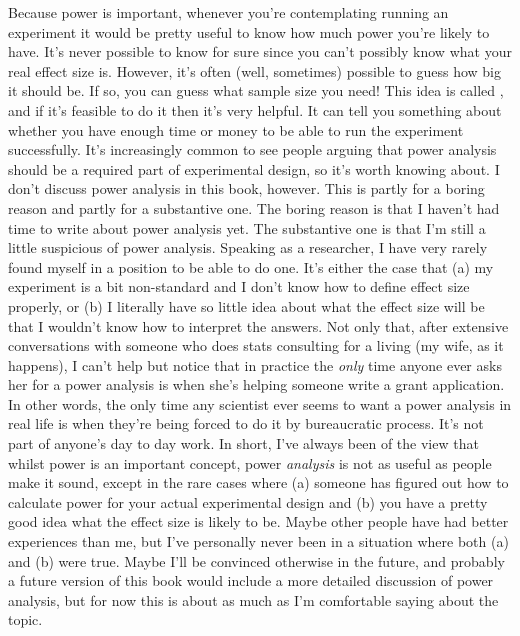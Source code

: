 Because power is important, whenever you're contemplating running an experiment it would be pretty useful to know how much power you're likely to have. It's never possible to know for sure since you can't possibly know what your real effect size is. However, it's often (well, sometimes) possible to guess how big it should be. If so, you can guess what sample size you need! This idea is called , and if it's feasible to do it then it's very helpful. It can tell you something about whether you have enough time or money to be able to run the experiment successfully. It's increasingly common to see people arguing that power analysis should be a required part of experimental design, so it's worth knowing about. I don't discuss power analysis in this book, however. This is partly for a boring reason and partly for a substantive one. The boring reason is that I haven't had time to write about power analysis yet. The substantive one is that I'm still a little suspicious of power analysis. Speaking as a researcher, I have very rarely found myself in a position to be able to do one. It's either the case that (a) my experiment is a bit non-standard and I don't know how to define effect size properly, or (b) I literally have so little idea about what the effect size will be that I wouldn't know how to interpret the answers. Not only that, after extensive conversations with someone who does stats consulting for a living (my wife, as it happens), I can't help but notice that in practice the {\it only} time anyone ever asks her for a power analysis is when she's helping someone write a grant application. In other words, the only time any scientist ever seems to want a power analysis in real life is when they're being forced to do it by bureaucratic process. It's not part of anyone's day to day work. In short, I've always been of the view that whilst power is an important concept, power {\it analysis} is not as useful as people make it sound, except in the rare cases where (a) someone has figured out how to calculate power for your actual experimental design and (b) you have a pretty good idea what the effect size is likely to be. Maybe other people have had better experiences than me, but I've personally never been in a situation where both (a) and (b) were true. Maybe I'll be convinced otherwise in the future, and probably a future version of this book would include a more detailed discussion of power analysis, but for now this is about as much as I'm comfortable saying about the topic.


